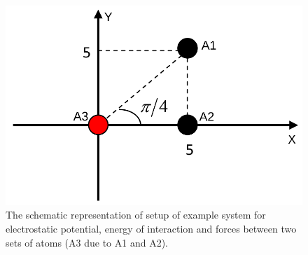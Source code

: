 \documentclass[9pt,tutorial,pubversion]{livecoms}
\begin{document}
\begin{figure}[hbt!]
\includegraphics[width=\linewidth]{Figure_10.png}
\caption{The schematic representation of setup of example system for electrostatic potential, energy of interaction and forces between two sets of atoms (A3 due to A1 and A2).}
\label{fig:elec_force}
\end{figure}
\end{document}
